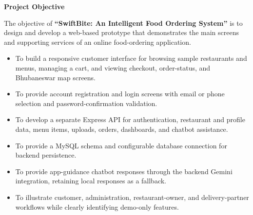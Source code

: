 \begin{center}

\vspace*{0.3in}

\Large{\textbf{Project Objective}}

\vspace{5mm}

\end{center}

\justifying

The objective of \textbf{``SwiftBite: An Intelligent Food Ordering System''} is to design and develop a web-based prototype that demonstrates the main screens and supporting services of an online food-ordering application.

\vspace{5mm}

\begin{itemize}
    \item To build a responsive customer interface for browsing sample restaurants and menus, managing a cart, and viewing checkout, order-status, and Bhubaneswar map screens.
    \item To provide account registration and login screens with email or phone selection and password-confirmation validation.
    \item To develop a separate Express API for authentication, restaurant and profile data, menu items, uploads, orders, dashboards, and chatbot assistance.
    \item To provide a MySQL schema and configurable database connection for backend persistence.
    \item To provide app-guidance chatbot responses through the backend Gemini integration, retaining local responses as a fallback.
    \item To illustrate customer, administration, restaurant-owner, and delivery-partner workflows while clearly identifying demo-only features.
\end{itemize}

